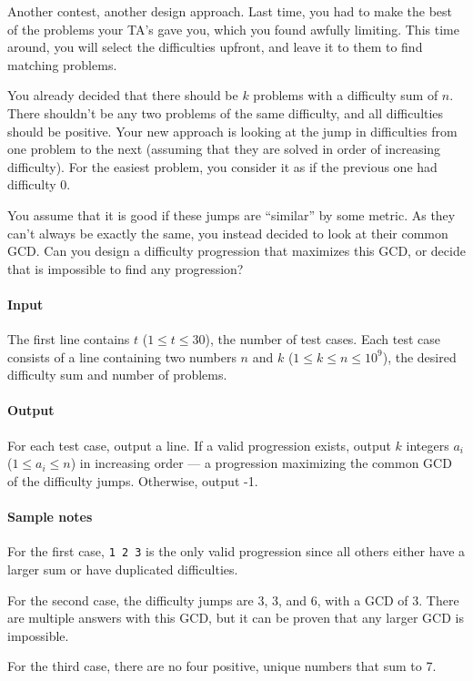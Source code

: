 

\usepackage{csquotes}




Another contest, another design approach.
Last time, you had to make the best of the problems your TA's gave you, which you found awfully limiting.
This time around, you will select the difficulties upfront, and leave it to them to find matching problems.

You already decided that there should be $k$ problems with a difficulty sum of $n$.
There shouldn't be any two problems of the same difficulty, and all difficulties should be positive.
Your new approach is looking at the jump in difficulties from one problem to the next (assuming that they are solved in order of increasing difficulty).
For the easiest problem, you consider it as if the previous one had difficulty 0.

You assume that it is good if these jumps are \enquote{similar} by some metric.
As they can't always be exactly the same, you instead decided to look at their common GCD.\@
Can you design a difficulty progression that maximizes this GCD, or decide that is impossible to find any progression?

\paragraph*{Input}

The first line contains $t$ ($1 \leq t \leq 30$), the number of test cases.
Each test case consists of a line containing two numbers $n$ and $k$ ($1 \leq k \leq n \leq 10^9$), the desired difficulty sum and number of problems.

\paragraph*{Output}

For each test case, output a line.
If a valid progression exists, output $k$ integers $a_i$ ($1 \leq a_i \leq n$) in increasing order --- a progression maximizing the common GCD of the difficulty jumps.
Otherwise, output -1.

\begin{samples}
\end{samples}

\paragraph*{Sample notes}

For the first case, \texttt{1 2 3} is the only valid progression since all others either have a larger sum or have duplicated difficulties.

For the second case, the difficulty jumps are $3$, $3$, and $6$, with a GCD of $3$.
There are multiple answers with this GCD, but it can be proven that any larger GCD is impossible.

For the third case, there are no four positive, unique numbers that sum to 7.


